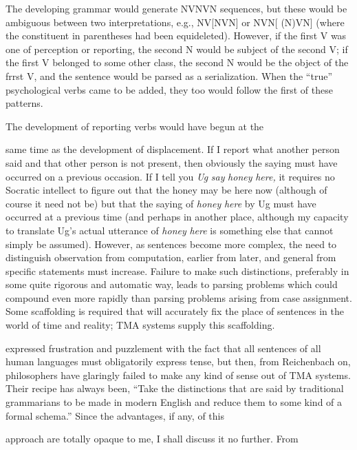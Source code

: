
The developing grammar would generate NVNVN sequences, but these would be ambiguous between two interpretations, e.g., NV[NVN] or NVN[ (N)VN] (where the constituent in parentheses had been equi\-deleted). However, if the first V was one of perception or reporting, the second N would be subject of the second V; if the first V belonged to some other class, the second N would be the object of the frrst V, and the sentence would be parsed as a serialization. When the ``true'' psychological verbs came to be added, they too would follow the first of these patterns.

The development of reporting verbs would have begun at the

same time as the development of displacement. If I report what another person said and that other person is not present, then obviously the saying must have occurred on a previous occasion. If I tell you \textit{U}\textit{g} \textit{say} \textit{honey} \textit{here,} it requires no Socratic intellect to figure out that the honey may be here now (although of course it need not be) but that the saying of \textit{honey} \textit{here} by Ug must have occurred at a previous time (and perhaps in another place, although my capacity to translate Ug's actual utterance of \textit{honey} \textit{here} is something else that cannot simply be assumed). However, as sentences become more complex, the need to distinguish observation from computation, earlier from later, and general from specific statements must increase. Failure to make such distinctions, preferably in some quite rigorous and automatic way, leads to parsing problems which could compound even more rapidly than parsing problems arising from case assignment. Some scaffolding is required that will accurately fix the place of sentences in the world of time and reality; TMA systems supply this scaffolding.

\citet[170]{Quine1960} expressed frustration and puzzlement with the fact that all sentences of all human languages must obligatorily express tense, but then, from Reichenbach on, philosophers have glaringly failed to make any kind of sense out of TMA systems. Their recipe has always been, ``Take the distinctions that are said by tradi\-tional grammarians to be made in modern English and reduce them to some kind of a formal schema.'' Since the advantages, if any, of this

approach are totally opaque to me, I shall discuss it no further. From


